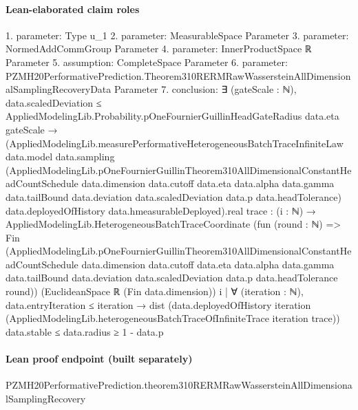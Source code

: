 \documentclass[10pt]{article}
\begin{document}
\paragraph{Lean-elaborated claim roles}\begin{ReviewVerbatim}
1. parameter: Type u_1
2. parameter: MeasurableSpace Parameter
3. parameter: NormedAddCommGroup Parameter
4. parameter: InnerProductSpace ℝ Parameter
5. assumption: CompleteSpace Parameter
6. parameter: PZMH20PerformativePrediction.Theorem310RERMRawWassersteinAllDimensionalSamplingRecoveryData Parameter
7. conclusion: ∃ (gateScale : ℕ),
  data.scaledDeviation ≤ AppliedModelingLib.Probability.pOneFournierGuillinHeadGateRadius data.eta gateScale →
    (AppliedModelingLib.measurePerformativeHeterogeneousBatchTraceInfiniteLaw data.model data.sampling
            (AppliedModelingLib.pOneFournierGuillinTheorem310AllDimensionalConstantHeadCountSchedule data.dimension
              data.cutoff data.eta data.alpha data.gamma data.tailBound data.deviation data.scaledDeviation data.p
              data.headTolerance)
            data.deployedOfHistory data.hmeasurableDeployed).real
        {trace :
          (i : ℕ) →
            AppliedModelingLib.HeterogeneousBatchTraceCoordinate
              (fun (round : ℕ) =>
                Fin
                  (AppliedModelingLib.pOneFournierGuillinTheorem310AllDimensionalConstantHeadCountSchedule
                    data.dimension data.cutoff data.eta data.alpha data.gamma data.tailBound data.deviation
                    data.scaledDeviation data.p data.headTolerance round))
              (EuclideanSpace ℝ (Fin data.dimension)) i |
          ∀ (iteration : ℕ),
            data.entryIteration ≤ iteration →
              dist
                  (data.deployedOfHistory iteration
                    (AppliedModelingLib.heterogeneousBatchTraceOfInfiniteTrace iteration trace))
                  data.stable ≤
                data.radius} ≥
      1 - data.p
\end{ReviewVerbatim}

\paragraph{Lean proof endpoint (built separately)}\begin{ReviewVerbatim}
PZMH20PerformativePrediction.theorem310RERMRawWassersteinAllDimensionalSamplingRecovery
\end{ReviewVerbatim}
\end{document}
